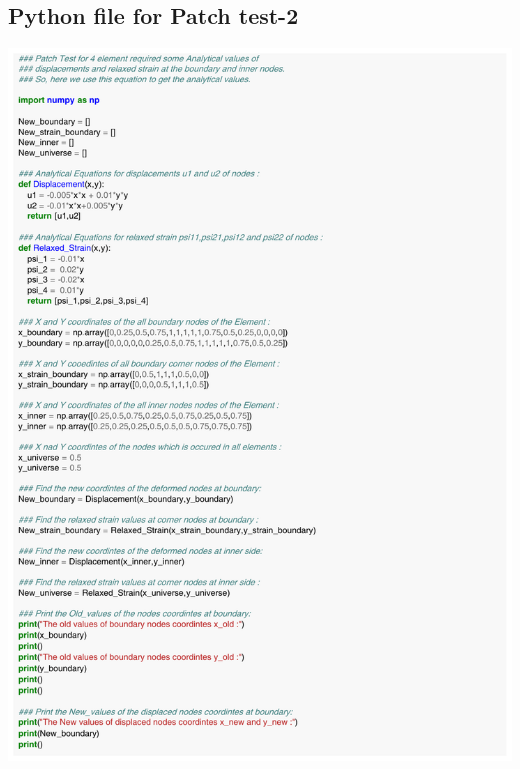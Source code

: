 \documentclass[12pt]{article}
\begin{document}
\begin{appendices}
\section{Python file for Patch test-2}
\includegraphics[scale=0.80,page=1]{Patch_Test_4_elem_eqn.pdf}
\\
\\

\end{appendices}
\end{document}
